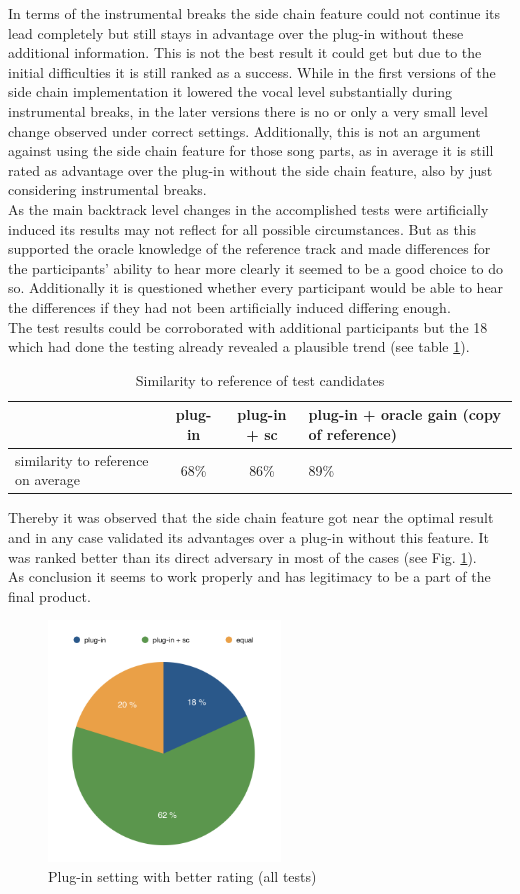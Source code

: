In terms of the instrumental breaks the side chain feature could not continue its lead completely but still stays in advantage over the plug-in without these additional information. This is not the best result it could get but due to the initial difficulties it is still ranked as a success. While in the first versions of the side chain implementation it lowered the vocal level substantially during instrumental breaks, in the later versions there is no or only a very small level change observed under correct settings. Additionally, this is not an argument against using the side chain feature for those song parts, as in average it is still rated as advantage over the plug-in without the side chain feature, also by just considering instrumental breaks.\\
As the main backtrack level changes in the accomplished tests were artificially induced its results may not reflect for all possible circumstances. But as this supported the oracle knowledge of the reference track and made differences for the participants' ability to hear more clearly it seemed to be a good choice to do so. Additionally it is questioned whether every participant would be able to hear the differences if they had not been artificially induced differing enough.\\
The test results could be corroborated with additional participants but the 18 which had done the testing already revealed a plausible trend (see table \ref{t2}).\\

\begin{table}[H]
	\centering
	\begin{tabular}{ p{4cm} | c | c | p{4cm} }
		& plug-in & plug-in + sc & plug-in + oracle gain (copy of reference) \\ \hline
		similarity to reference on average & 68\% & 86\% & 89\% \\
	\end{tabular}
	\label{t2}
	\caption{Similarity to reference of test candidates}
\end{table}

Thereby it was observed that the side chain feature got near the optimal result and in any case validated its advantages over a plug-in without this feature. It was ranked better than its direct adversary in most of the cases (see Fig. \ref{b1}).\\
As conclusion it seems to work properly and has legitimacy to be a part of the final product.\\

\begin{figure}[H]
\includegraphics[width=0.55\textwidth]{images/betterRating}
	\centering
	\caption{Plug-in setting with better rating (all tests)}
	\label{b1}
\end{figure}
